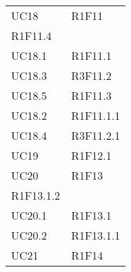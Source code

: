 \begin{longtable}{|C{6.5cm}|C{6.5cm}|}
	UC18 & \centering R1F11 \\ R1F11.4 \tabularnewline
	UC18.1 & R1F11.1 \\
	UC18.3 & R3F11.2 \\
	UC18.5 & R1F11.3 \\
	UC18.2 & R1F11.1.1 \\
	UC18.4 & R3F11.2.1 \\
	UC19 & R1F12.1 \\
	UC20 & \centering R1F13 \\ R1F13.1.2 \tabularnewline
	UC20.1 & R1F13.1 \\
	UC20.2 & R1F13.1.1 \\
	UC21 & R1F14 \\
\end{longtable}
